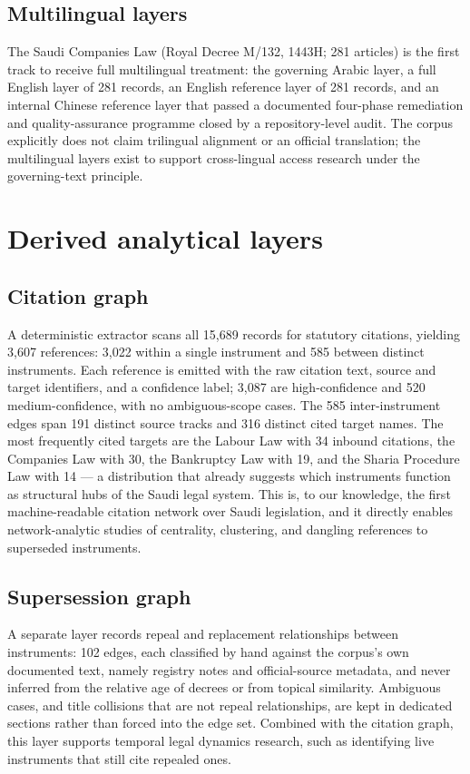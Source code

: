 \documentclass[sn-basic]{sn-jnl}%
\begin{document}
\subsection{Multilingual layers}

The Saudi Companies Law (Royal Decree M/132, 1443H; 281 articles) is the
first track to receive full multilingual treatment: the governing Arabic
layer, a full English layer of 281 records, an English reference layer of
281 records, and an internal Chinese reference layer that passed a
documented four-phase remediation and quality-assurance programme closed by
a repository-level audit. The corpus explicitly does not claim trilingual
alignment or an official translation; the multilingual layers exist to
support cross-lingual access research under the governing-text principle.

\section{Derived analytical layers}
\label{sec:layers}

\subsection{Citation graph}

A deterministic extractor scans all 15{,}689 records for statutory
citations, yielding 3{,}607 references: 3{,}022 within a single instrument
and 585 between distinct instruments. Each reference is emitted with the raw
citation text, source and target identifiers, and a confidence label; 3{,}087
are high-confidence and 520 medium-confidence, with no ambiguous-scope
cases. The 585 inter-instrument edges span 191 distinct source tracks and
316 distinct cited target names. The most frequently cited targets are the
Labour Law with 34 inbound citations, the Companies Law with 30, the
Bankruptcy Law with 19, and the Sharia Procedure Law with 14 --- a
distribution that already suggests which instruments function as structural
hubs of the Saudi legal system. This is, to our knowledge, the first
machine-readable citation network over Saudi legislation, and it directly
enables network-analytic studies of centrality, clustering, and dangling
references to superseded instruments.

\subsection{Supersession graph}

A separate layer records repeal and replacement relationships between
instruments: 102 edges, each classified by hand against the corpus's own
documented text, namely registry notes and official-source metadata, and
never inferred from the relative age of decrees or from topical similarity.
Ambiguous cases, and title collisions that are not repeal relationships, are
kept in dedicated sections rather than forced into the edge set. Combined
with the citation graph, this layer supports temporal legal dynamics
research, such as identifying live instruments that still cite repealed
ones.
\end{document}
